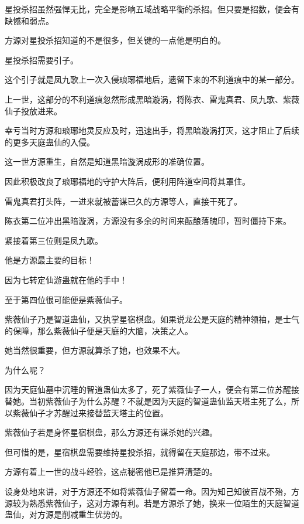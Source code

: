 
\begin{this_body}



星投杀招虽然强悍无比，完全是影响五域战略平衡的杀招。但只要是招数，便会有缺憾和弱点。

方源对星投杀招知道的不是很多，但关键的一点他是明白的。

星投杀招需要引子。

这个引子就是凤九歌上一次入侵琅琊福地后，遗留下来的不利道痕中的某一部分。

上一世，这部分的不利道痕忽然形成黑暗漩涡，将陈衣、雷鬼真君、凤九歌、紫薇仙子投放进来。

幸亏当时方源和琅琊地灵反应及时，迅速出手，将黑暗漩涡打灭，这才阻止了后续的更多天庭蛊仙的入侵。

这一世方源重生，自然是知道黑暗漩涡成形的准确位置。

因此积极改良了琅琊福地的守护大阵后，便利用阵道空间将其罩住。

雷鬼真君打头阵，一进来就被蓄谋已久的方源等人，直接干死了。

陈衣第二位冲出黑暗漩涡，方源没有多余的时间来酝酿落魄印，暂时僵持下来。

紧接着第三位则是凤九歌。

他是方源最主要的目标！

因为七转定仙游蛊就在他的手中！

至于第四位很可能便是紫薇仙子。

紫薇仙子乃是智道蛊仙，又执掌星宿棋盘。如果说龙公是天庭的精神领袖，是士气的保障，那么紫薇仙子便是天庭的大脑，决策之人。

她当然很重要，但方源就算杀了她，也效果不大。

为什么呢？

因为天庭仙墓中沉睡的智道蛊仙太多了，死了紫薇仙子一人，便会有第二位苏醒接替她。当初紫薇仙子为什么苏醒？不就是因为天庭的智道蛊仙监天塔主死了么，所以紫薇仙子才苏醒过来接替监天塔主的位置。

紫薇仙子若是身怀星宿棋盘，那么方源还有谋杀她的兴趣。

但可惜的是，星宿棋盘需要维持星投杀招，就得留在天庭那边，带不过来。

方源有着上一世的战斗经验，这点秘密他已是推算清楚的。

设身处地来讲，对于方源还不如将紫薇仙子留着一命。因为知己知彼百战不殆，方源较为熟悉紫薇仙子，这对方源有利。若是方源杀了她，换来一位陌生的天庭智道蛊仙，对方源是削减重生优势的。


\end{this_body}
